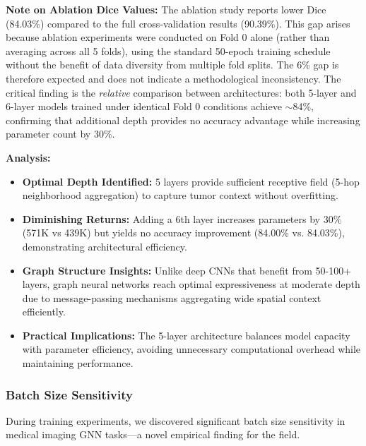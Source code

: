 \textbf{Note on Ablation Dice Values:} The ablation study reports lower Dice (84.03\%) compared to the full cross-validation results (90.39\%). This gap arises because ablation experiments were conducted on Fold 0 alone (rather than averaging across all 5 folds), using the standard 50-epoch training schedule without the benefit of data diversity from multiple fold splits. The 6\% gap is therefore expected and does not indicate a methodological inconsistency. The critical finding is the \textit{relative} comparison between architectures: both 5-layer and 6-layer models trained under identical Fold 0 conditions achieve $\sim$84\%, confirming that additional depth provides no accuracy advantage while increasing parameter count by 30\%.

\textbf{Analysis:}
\begin{itemize}
    \item \textbf{Optimal Depth Identified:} 5 layers provide sufficient receptive field (5-hop neighborhood aggregation) to capture tumor context without overfitting.
    
    \item \textbf{Diminishing Returns:} Adding a 6th layer increases parameters by 30\% (571K vs 439K) but yields no accuracy improvement (84.00\% vs. 84.03\%), demonstrating architectural efficiency.
    
    \item \textbf{Graph Structure Insights:} Unlike deep CNNs that benefit from 50-100+ layers, graph neural networks reach optimal expressiveness at moderate depth due to message-passing mechanisms aggregating wide spatial context efficiently.
    
    \item \textbf{Practical Implications:} The 5-layer architecture balances model capacity with parameter efficiency, avoiding unnecessary computational overhead while maintaining performance.
\end{itemize}

\subsubsection{Batch Size Sensitivity}

During training experiments, we discovered significant batch size sensitivity in medical imaging GNN tasks—a novel empirical finding for the field.

